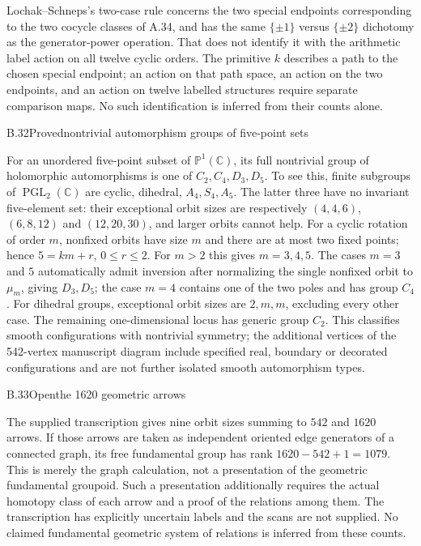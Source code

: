Lochak--Schneps's two-case rule concerns the two special endpoints
corresponding to the two cocycle classes of A.34, and has the same
$\{\pm1\}$ versus $\{\pm2\}$ dichotomy as the generator-power
operation. That does not identify it with the arithmetic label action
on all twelve cyclic orders. The primitive $k$ describes a path to
the chosen special endpoint; an action on that path space, an action
on the two endpoints, and an action on twelve labelled structures
require separate comparison maps. No such identification is inferred
from their counts alone.

\begin{statement}{B.32}{Proved}{nontrivial automorphism groups of five-point sets}
\end{statement}
For an unordered five-point subset of $\mathbb P^1(\mathbb C)$, its
full nontrivial group of holomorphic automorphisms is one of
$C_2,C_4,D_3,D_5$. To see this, finite subgroups of
$\operatorname{PGL}_2(\mathbb C)$ are cyclic, dihedral, $A_4,S_4,A_5$.
The latter three have no invariant five-element set: their exceptional
orbit sizes are respectively $(4,4,6)$, $(6,8,12)$ and $(12,20,30)$, and
larger orbits cannot help. For a cyclic rotation of order $m$, nonfixed
orbits have size $m$ and there are at most two fixed points; hence
$5=km+r$, $0\leq r\leq2$. For $m>2$ this gives $m=3,4,5$.
The cases $m=3$ and $5$ automatically admit inversion after normalizing
the single nonfixed orbit to $\mu_m$, giving $D_3,D_5$; the case $m=4$
contains one of the two poles and has group $C_4$. For dihedral groups,
exceptional orbit sizes are $2,m,m$, excluding every other case.
The remaining one-dimensional locus has generic group $C_2$.
This classifies smooth configurations with nontrivial symmetry; the
additional vertices of the 542-vertex manuscript diagram include specified
real, boundary or decorated configurations and are not further isolated
smooth automorphism types.

\begin{statement}{B.33}{Open}{the 1620 geometric arrows}
\end{statement}
The supplied transcription gives nine orbit sizes summing to $542$ and
$1620$ arrows. If those arrows are taken as independent oriented edge
generators of a connected graph, its free fundamental group has rank
$1620-542+1=1079$. This is merely the graph calculation, not a presentation
of the geometric fundamental groupoid. Such a presentation additionally
requires the actual homotopy class of each arrow and a proof of the
relations among them. The transcription has explicitly uncertain labels
and the scans are not supplied. No claimed fundamental geometric system
of relations is inferred from these counts.

